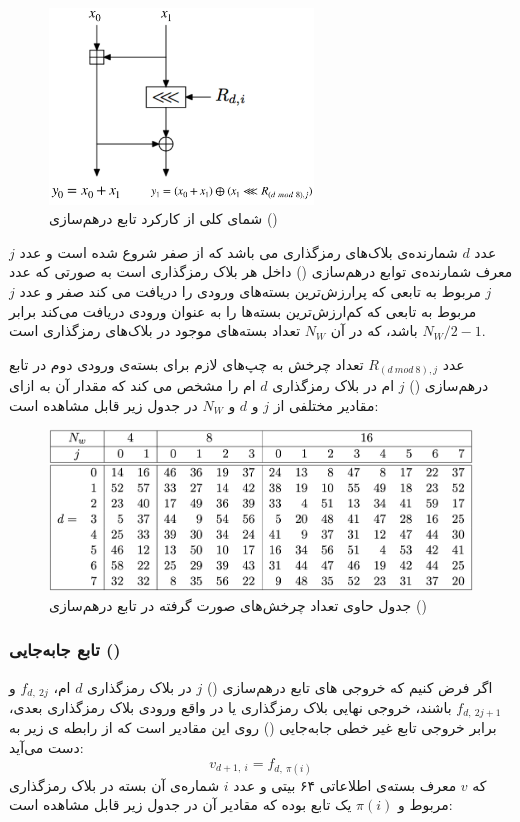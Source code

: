 \begin{figure}[H]
	\centering
	\includegraphics[width=7cm]{Images/Introduction/mix_function_dataflow.png}	
	\caption{
		شمای کلی از کارکرد تابع درهم‌سازی ()
	}
\end{figure}


عدد
$d$
 شمارنده‌ی بلاک‌های رمزگذاری‌ می باشد که از صفر شروع شده است و عدد $j$ معرف شمارنده‌ی توابع درهم‌سازی () داخل هر بلاک رمزگذاری است به صورتی که  عدد $j$  مربوط به تابعی که پرارزش‌ترین بسته‌های ورودی را دریافت می کند صفر و عدد $j$ مربوط به تابعی که کم‌ارزش‌ترین بسته‌ها را به عنوان ورودی دریافت می‌کند برابر 
$N_W/2 - 1$ 
‌باشد، که در آن 
$N_W$
تعداد بسته‌های موجود در بلاک‌های رمزگذاری است.


عدد 
$ R_{(d\ mod\  8),j}$
تعداد چرخش به چپ‌های لازم برای بسته‌ی ورودی دوم در تابع درهم‌سازی () $j$ ام در بلاک رمزگذاری $d$ ام را مشخص می کند که مقدار آن  به ازای مقادیر مختلفی از 
$j$ و
$d$ و
$N_W$ 
در جدول زیر قابل مشاهده است:
  
  \begin{figure}[H]
  	\centering
  	\includegraphics[width=15cm]{Images/Introduction/mix_function_rotate_values.png}	
  	\caption{جدول حاوی تعداد چرخش‌های صورت گرفته در تابع 
  	درهم‌سازی ()
  }
  \end{figure}

\pagebreak
\subsubsection{
تابع جابه‌جایی ()
}
اگر فرض کنیم که خروجی های تابع درهم‌سازی () $j$ در بلاک رمزگذاری $d$ ام، 
$f_{d,\ 2j}$
و
$f_{d,\ 2j+1}$
باشند، خروجی نهایی بلاک رمزگذاری یا در واقع ورودی بلاک رمزگذاری بعدی، برابر خروجی تابع غیر خطی جابه‌جایی () روی این مقادیر است که از رابطه ی زیر به دست می‌آید:
$$v_{d+1,\ i} = f_{d,\ \pi(i)}$$
که
$v$
معرف بسته‌ی اطلاعاتی ۶۴ بیتی و عدد
 $i$
  شماره‌ی آن بسته در بلاک رمزگذاری مربوط و  $\pi(i)$ یک تابع بوده که مقادیر آن در جدول زیر قابل مشاهده است:

